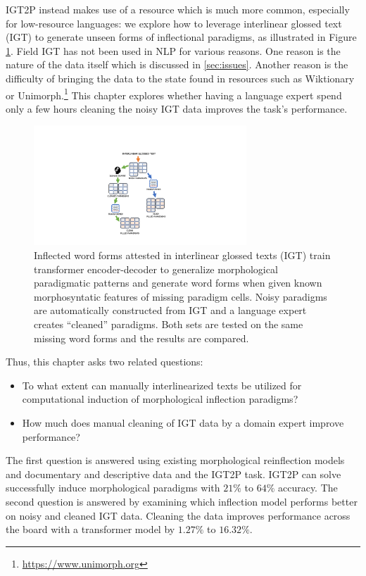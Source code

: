IGT2P instead makes use of a resource which is much more common, especially for low-resource languages:
we explore how to leverage interlinear glossed text (IGT) to generate unseen forms of inflectional paradigms, as illustrated in Figure \ref{fig:Workflow}. Field IGT has not been used in NLP for various reasons. One reason is the nature of the data itself which is discussed in \ref{sec:issues}. Another reason is the difficulty of bringing the data to the state found in resources such as Wiktionary or Unimorph.\footnote{\url{https://www.unimorph.org}} This chapter explores whether having a language expert spend only a few hours cleaning the noisy IGT data improves the task's performance. 


\begin{figure}[!tb]
    \centering
    \includegraphics[width=8cm]{figs/IGT-Paradigm-Workflow2.pdf}
    \caption[IGT2P Overview]{Inflected word forms attested in interlinear glossed texts (IGT) train transformer encoder-decoder to generalize morphological paradigmatic patterns and generate word forms when given known morphosyntatic features of missing paradigm cells. Noisy paradigms are automatically constructed from IGT and a language expert creates ``cleaned'' paradigms. Both sets are tested on the same missing word forms and the results are compared.}
    \label{fig:Workflow}
\end{figure}


Thus, this chapter asks two related questions: 
\begin{itemize}
    \item To what extent can manually interlinearized texts be utilized for computational induction of morphological inflection paradigms? 
    \item How much does manual cleaning of IGT data by a domain expert improve performance?
\end{itemize}

The first question is answered using existing morphological reinflection models and documentary and descriptive data and the IGT2P task. IGT2P can solve successfully induce morphological paradigms with $21\%$ to $64\%$ accuracy. The second question is answered by examining which inflection model performs better on noisy and cleaned IGT data. Cleaning the data improves performance across the board with a transformer model by $1.27\%$ to $16.32\%$. 


